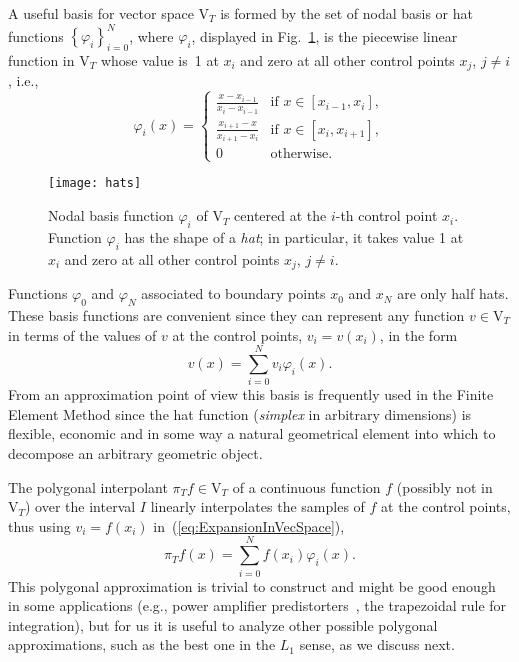 \documentclass[a4paper,english]{IEEEtran}
\begin{document}
A useful basis for vector space ${\mathrm{V}_{T}}$ is formed by the set
of nodal basis or hat functions $\left\{ \varphi_{i}\right\} _{i=0}^{N}$,
where $\varphi_{i}$, displayed in Fig.~\ref{fig:Hat-functions},
is the piecewise linear function in ${\mathrm{V}_{T}}$ whose value is~1
at $x_{i}$ and zero at all other control points $x_{j}$, $j\neq i$,
i.e., 
\[
\varphi_{i}(x)=\begin{cases}
\frac{x-x_{i-1}}{x_{i}-x_{i-1}} & \text{if }x\in[x_{i-1},x_{i}],\\
\frac{x_{i+1}-x}{x_{i+1}-x_{i}} & \text{if }x\in[x_{i},x_{i+1}],\\
0 & \text{otherwise}.
\end{cases}
\]
\begin{figure}
\begin{centering}
\texttt{[image: hats]}
\par\end{centering}

\caption{\label{fig:Hat-functions}Nodal basis function $\varphi_{i}$ of ${\mathrm{V}_{T}}$
centered at the $i$-th control point $x_{i}$. Function $\varphi_{i}$
has the shape of a \emph{hat}; in particular, it takes value 1 at
$x_{i}$ and zero at all other control points $x_{j}$, $j\neq i$.}
\end{figure}
Functions $\varphi_{0}$ and $\varphi_{N}$ associated to boundary
points $x_{0}$ and $x_{N}$ are only half hats. These basis functions
are convenient since they can represent any function $v\in{\mathrm{V}_{T}}$
in terms of the values of $v$ at the control points, $v_{i}=v(x_{i})$,
in the form
\begin{equation}
v(x)=\sum_{i=0}^{N}v_{i}\varphi_{i}(x).\label{eq:ExpansionInVecSpace}
\end{equation}
From an approximation point of view this basis is frequently used
in the Finite Element Method since the hat function (\emph{simplex}
in arbitrary dimensions) is flexible, economic and in some way a natural
geometrical element into which to decompose an arbitrary geometric
object.

The polygonal interpolant ${\pi_{T}} f\in{\mathrm{V}_{T}}$ of a continuous function
$f$ (possibly not in ${\mathrm{V}_{T}}$) over the interval $I$ linearly
interpolates the samples of $f$ at the control points, thus using
$v_{i}=f(x_{i})$ in~(\ref{eq:ExpansionInVecSpace}), 
\[
{\pi_{T}} f(x)=\sum_{i=0}^{N}f(x_{i})\varphi_{i}(x).
\]
This polygonal approximation is trivial to construct and might be
good enough in some applications (e.g., power amplifier predistorters~\cite{Ba2008},
the trapezoidal rule for integration), but for us it is useful to
analyze other possible polygonal approximations, such as the best
one in the ${L_{1}}$ sense, as we discuss next.
\end{document}
